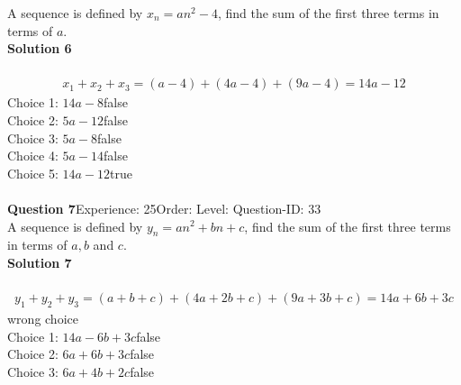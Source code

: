 \documentclass{article}
\begin{document}
A sequence is defined by $x_n=an^2-4$, find the sum of the first three terms in terms of $a$.\\[4pt]
\noindent\textbf{Solution 6}\\[2pt]
\\[-35pt]\begin{align*}
x_1+x_2+x_3=(a-4)+(4a-4)+(9a-4)=14a-12
\end{align*}
Choice 1: \hspace{20pt}$14a-8$\hspace{20pt}false\\
Choice 2: \hspace{20pt}$5a-12$\hspace{20pt}false\\
Choice 3: \hspace{20pt}$5a-8$\hspace{20pt}false\\
Choice 4: \hspace{20pt}$5a-14$\hspace{20pt}false\\
Choice 5: \hspace{20pt}$14a-12$\hspace{20pt}true\\
\\[4pt]
\noindent\textbf{Question 7}\hspace{20pt}Experience: 25\hspace{20pt}Order: \hspace{20pt}Level: \hspace{20pt}Question-ID: 33\\[2pt]
A sequence is defined by $y_n=an^2+bn+c$, find the sum of the first three terms in terms of $a,b$ and $c$.\\[4pt]
\noindent\textbf{Solution 7}\\[2pt]
\\[-35pt]\begin{align*}
y_1+y_2+y_3=(a+b+c)+(4a+2b+c)+(9a+3b+c)=14a+6b+3c
\end{align*}
wrong choice\\[4pt]
Choice 1: \hspace{20pt}$14a-6b+3c$\hspace{20pt}false\\
Choice 2: \hspace{20pt}$6a+6b+3c$\hspace{20pt}false\\
Choice 3: \hspace{20pt}$6a+4b+2c$\hspace{20pt}false\\
\end{document}
